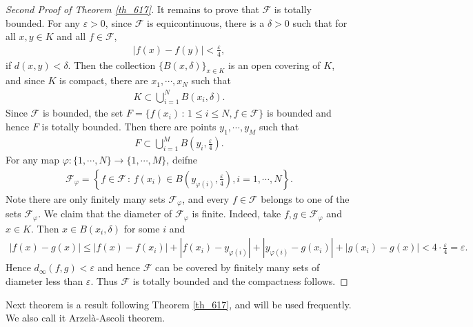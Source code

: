 \documentclass[10pt]{book}
\theoremstyle{definition}
\numberwithin{equation}{chapter}
\begin{document}
\begin{proof}[Second Proof of Theorem \ref{th_617}]
It remains to prove that $\mathcal{F}$ is totally bounded. For any $\varepsilon > 0$, since $\mathcal{F}$ is equicontinuous, there is a $\delta > 0$ such that for all $x,y \in K$ and all $f \in \mathcal{F}$, 
\begin{align*}
    \left|f(x) - f(y)\right| < \frac{\varepsilon}{4},
\end{align*}
if $d(x,y) < \delta$. Then the collection $\{B(x,\delta)\}_{x \in K}$ is an open covering of $K$, and since $K$ is compact, there are $x_1, \cdots, x_N$ such that
\begin{align*}
    K \subset \bigcup^N_{i=1} B(x_i,\delta).
\end{align*}
Since $\mathcal{F}$ is bounded, the set $F = \{f(x_i) \,:\, 1 \leq i \leq N, f \in \mathcal{F}\}$ is bounded and hence $F$ is totally bounded. Then there are points $y_1, \cdots, y_M$ such that
\begin{align*}
    F \subset \bigcup^M_{i=1} B\left(y_i, \frac{\varepsilon}{4}\right).
\end{align*}
For any map $\varphi: \{1,\cdots,N\} \to \{1,\cdots,M\}$, deifne
\begin{align*}
    \mathcal{F}_{\varphi} = \left\{f \in \mathcal{F} \,:\, f(x_i) \in B\left(y_{\varphi(i)}, \frac{\varepsilon}{4}\right), i = 1,\cdots,N \right\}.
\end{align*}
Note there are only finitely many sets $\mathcal{F}_{\varphi}$, and every $f \in \mathcal{F}$ belongs to one of the sets $\mathcal{F}_{\varphi}$. We claim that the diameter of $\mathcal{F}_{\varphi}$ is finite. Indeed, take $f, g \in \mathcal{F}_{\varphi}$ and $x \in K$. Then $x \in B(x_i,\delta)$ for some $i$ and 
\begin{align*}
    \left|f(x) - g(x)\right| \leq \left|f(x) - f(x_i)\right| + \left|f(x_i) - y_{\varphi(i)}\right| + \left|y_{\varphi(i)} - g(x_i)\right| + \left|g(x_i) - g(x)\right| < 4 \cdot \frac{\varepsilon}{4} = \varepsilon.
\end{align*}
Hence $d_{\infty}(f,g) < \varepsilon$ and hence $\mathcal{F}$ can be covered by finitely many sets of diameter less than $\varepsilon$. Thus $\mathcal{F}$ is totally bounded and the compactness follows.
\end{proof}

\medskip

Next theorem is a result following Theorem \ref{th_617}, and will be used frequently. We also call it Arzelà-Ascoli theorem.

\medskip
\end{document}
